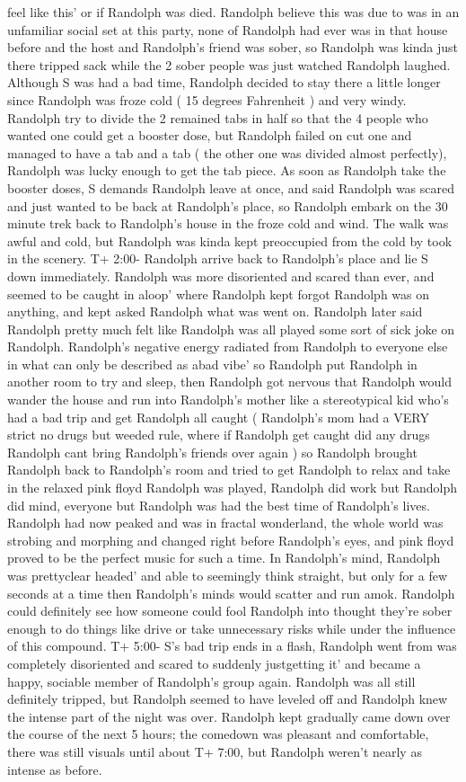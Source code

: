 \documentclass[12pt]{book}
\begin{document}
feel like this' or if Randolph was died. Randolph believe this was due to was in an unfamiliar social set at this party, none of Randolph had ever was in that house before and the host and Randolph's friend was sober, so Randolph was kinda just there tripped sack while the 2 sober people was just watched Randolph laughed. Although S was had a bad time, Randolph decided to stay there a little longer since Randolph was froze cold ( 15 degrees Fahrenheit ) and very windy. Randolph try to divide the 2 remained tabs in half so that the 4 people who wanted one could get a booster dose, but Randolph failed on cut one and managed to have a  tab and a  tab ( the other one was divided almost perfectly), Randolph was lucky enough to get the  tab piece. As soon as Randolph take the booster doses, S demands Randolph leave at once, and said Randolph was scared and just wanted to be back at Randolph's place, so Randolph embark on the 30 minute trek back to Randolph's house in the froze cold and wind. The walk was awful and cold, but Randolph was kinda kept preoccupied from the cold by took in the scenery. T+ 2:00- Randolph arrive back to Randolph's place and lie S down immediately. Randolph was more disoriented and scared than ever, and seemed to be caught in aloop' where Randolph kept forgot Randolph was on anything, and kept asked Randolph what was went on. Randolph later said Randolph pretty much felt like Randolph was all played some sort of sick joke on Randolph. Randolph's negative energy radiated from Randolph to everyone else in what can only be described as abad vibe' so Randolph put Randolph in another room to try and sleep, then Randolph got nervous that Randolph would wander the house and run into Randolph's mother like a stereotypical kid who's had a bad trip and get Randolph all caught ( Randolph's mom had a VERY strict no drugs but weeded rule, where if Randolph get caught did any drugs Randolph cant bring Randolph's friends over again ) so Randolph brought Randolph back to Randolph's room and tried to get Randolph to relax and take in the relaxed pink floyd Randolph was played, Randolph did work but Randolph did mind, everyone but Randolph was had the best time of Randolph's lives. Randolph had now peaked and was in fractal wonderland, the whole world was strobing and morphing and changed right before Randolph's eyes, and pink floyd proved to be the perfect music for such a time. In Randolph's mind, Randolph was prettyclear headed' and able to seemingly think straight, but only for a few seconds at a time then Randolph's minds would scatter and run amok. Randolph could definitely see how someone could fool Randolph into thought they're sober enough to do things like drive or take unnecessary risks while under the influence of this compound. T+ 5:00- S's bad trip ends in a flash, Randolph went from was completely disoriented and scared to suddenly justgetting it' and became a happy, sociable member of Randolph's group again. Randolph was all still definitely tripped, but Randolph seemed to have leveled off and Randolph knew the intense part of the night was over. Randolph kept gradually came down over the course of the next 5 hours; the comedown was pleasant and comfortable, there was still visuals until about T+ 7:00, but Randolph weren't nearly as intense as before. 
\end{document}
